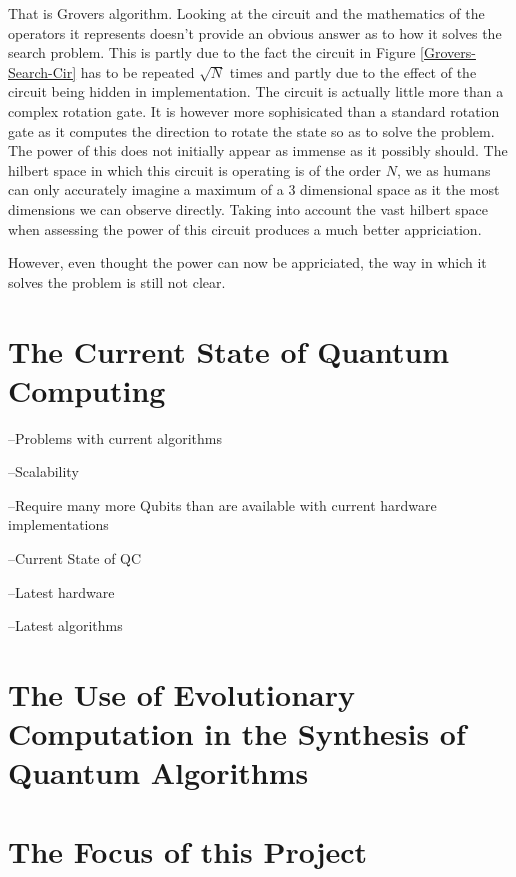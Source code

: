 \documentclass[authoryearcitations]{UoYCSproject}
\begin{document}
That is Grovers algorithm.
Looking at the circuit and the mathematics of the operators it represents doesn't provide an obvious answer as to how it solves the search problem.
This is partly due to the fact the circuit in Figure \ref{Grovers-Search-Cir} has to be repeated $\sqrt{N}$ times and partly due to the effect of the circuit being hidden in implementation.
The circuit is actually little more than a complex rotation gate.
It is however more sophisicated than a standard rotation gate as it computes the direction to rotate the state so as to solve the problem.
The power of this does not initially appear as immense as it possibly should.
The hilbert space in which this circuit is operating is of the order $N$, we as humans can only accurately imagine a maximum of a $3$ dimensional space as it the most dimensions we can observe directly.
Taking into account the vast hilbert space when assessing the power of this circuit produces a much better appriciation.

However, even thought the power can now be appriciated, the way in which it solves the problem is still not clear. 

\section{The Current State of Quantum Computing}
--Problems with current algorithms

	--Scalability
	
	--Require many more Qubits than are available with current hardware implementations

 
--Current State of QC
	
	--Latest hardware
	
	--Latest algorithms

\section{The Use of Evolutionary Computation in the Synthesis of Quantum Algorithms}

\section{The Focus of this Project}


\end{document}
